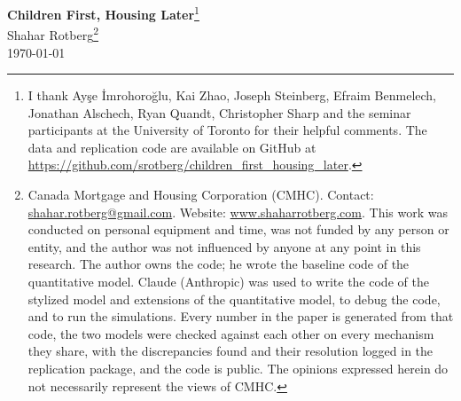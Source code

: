\documentclass[10pt]{article}
\begin{document}
\begin{center}
\renewcommand{\thefootnote}{\fnsymbol{footnote}}
{\Large\bfseries Children First, Housing Later}\footnote{I thank Ay\c{s}e \.{I}mrohoro\u{g}lu, Kai Zhao, Joseph Steinberg, Efraim Benmelech, Jonathan Alschech, Ryan Quandt, Christopher Sharp and the seminar participants at the University of Toronto for their helpful comments. The data and replication code are available on GitHub at \url{https://github.com/srotberg/children_first_housing_later}.}\\[0.6em]
{\large Shahar Rotberg}\footnote{Canada Mortgage and Housing Corporation (CMHC). Contact: \url{shahar.rotberg@gmail.com}. Website: \url{www.shaharrotberg.com}. This work was conducted on personal equipment and time, was not funded by any person or entity, and the author was not influenced by anyone at any point in this research. The author owns the code; he wrote the baseline code of the quantitative model. Claude (Anthropic) was used to write the code of the stylized model and extensions of the quantitative model, to debug the code, and to run the simulations. Every number in the paper is generated from that code, the two models were checked against each other on every mechanism they share, with the discrepancies found and their resolution logged in the replication package, and the code is public. The opinions expressed herein do not necessarily represent the views of CMHC.}\\[0.35em]
\today
\end{center}
\renewcommand{\thefootnote}{\arabic{footnote}}
\setcounter{footnote}{0}
\end{document}
